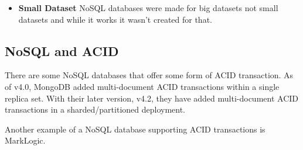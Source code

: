 \documentclass[
	paper=a4,%
	pagesize,%
	8pt, fleqn,%
	headings=small,%
	notitlepage,%
	parskip=never]%
	{scrreprt}
\begin{document}
\begin{multicols*}{3}
\begin{itemize}
\item \textbf{Small Dataset} NoSQL databases were made for big datasets not small datasets and while it works it wasn’t created for that.

\end{itemize}

\subsection{NoSQL and ACID}
There are some NoSQL databases that offer some form of ACID transaction. As of v4.0, MongoDB added multi-document ACID transactions within a single replica set. With their later version, v4.2, they have added multi-document ACID transactions in a sharded/partitioned deployment.

Another example of a NoSQL database supporting ACID transactions is MarkLogic.


\nocite{*}
\printbibliography

\end{multicols*}
\end{document}
